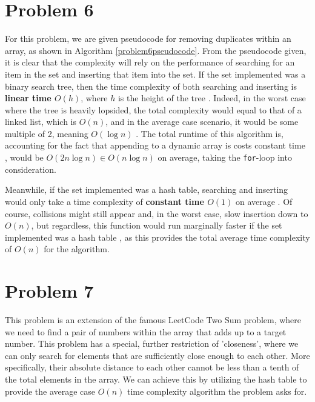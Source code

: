 \documentclass{report}
\begin{document}
\section*{Problem 6}
For this problem, we are given pseudocode for removing duplicates within an array, as shown in Algorithm \ref{problem6pseudocode}. From the pseudocode given, it is clear that the complexity will rely on the performance of searching for an item in the set and inserting that item into the set. If the set implemented was a binary search tree, then the time complexity of both searching and inserting is \textbf{linear time $O(h)$}, where $h$ is the height of the tree \autocite{BinarySearchTree2025}. Indeed, in the worst case where the tree is heavily lopsided, the total complexity would equal to that of a linked list, which is $O(n)$, and in the average case scenario, it would be some multiple of 2, meaning $O(\log n)$ \autocite{BinarySearchTree2025}. The total runtime of this algorithm is, accounting for the fact that appending to a dynamic array is costs constant time \autocite{ptinAnswerWhyTime2023}, would be $O(2n\log n) \in \boxed{O(n\log n)}$ on average, taking the \lstinline|for|-loop into consideration.

Meanwhile, if the set implemented was a hash table, searching and inserting would only take a time complexity of \textbf{constant time $O(1)$} on average \autocite{HashTable2025}. Of course, collisions might still appear and, in the worst case, slow insertion down to $O(n)$, but regardless, this function would run marginally faster if the set implemented was a hash table \autocite{HashTable2025}, as this provides the total average time complexity of $\boxed{O(n)}$ for the algorithm.
\begin{algorithm}[h]
	\caption{Pseudocode provided in Problem 6.}
	\SetAlgoLined
	
	\label{problem6pseudocode}
\end{algorithm}

\section*{Problem 7}
This problem is an extension of the famous LeetCode Two Sum problem, where we need to find a pair of numbers within the array that adds up to a target number. This problem has a special, further restriction of 'closeness', where we can only search for elements that are sufficiently close enough to each other. More specifically, their absolute distance to each other cannot be less than a tenth of the total elements in the array. We can achieve this by utilizing the hash table to provide the average case $O(n)$ time complexity algorithm the problem asks for.
\end{document}
